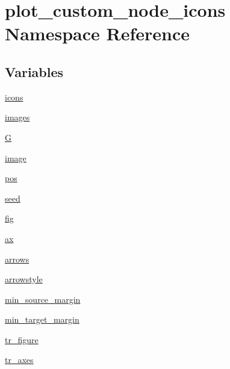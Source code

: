 \hypertarget{namespaceplot__custom__node__icons}{}\section{plot\+\_\+custom\+\_\+node\+\_\+icons Namespace Reference}
\label{namespaceplot__custom__node__icons}
\subsection*{Variables}
\begin{DoxyCompactItemize}
\item 
\hyperlink{namespaceplot__custom__node__icons_aac9e2479fe73f982e5131d12e30c472a}{icons}
\item 
\hyperlink{namespaceplot__custom__node__icons_a2dc5d47cfa47552a3cfc688160a954e0}{images}
\item 
\hyperlink{namespaceplot__custom__node__icons_ad0a8ac6ac593ba54a2e51a55e01ab8ff}{G}
\item 
\hyperlink{namespaceplot__custom__node__icons_a7757b01723f5675b0dc4c08966ae6eeb}{image}
\item 
\hyperlink{namespaceplot__custom__node__icons_a75672c8fced787072bbe8ed3eca7752d}{pos}
\item 
\hyperlink{namespaceplot__custom__node__icons_aae3e1f6f9d5d976f22908b54b8b5779d}{seed}
\item 
\hyperlink{namespaceplot__custom__node__icons_ad8137e4a72dc20d65848cf76ba421cf0}{fig}
\item 
\hyperlink{namespaceplot__custom__node__icons_aa6e807b10295ec70a54db2f32ee12298}{ax}
\item 
\hyperlink{namespaceplot__custom__node__icons_a5170af57723c73a5fa90a7a8f3e66cd7}{arrows}
\item 
\hyperlink{namespaceplot__custom__node__icons_ac7523f31b7fdc3da4f53e636aaa09e55}{arrowstyle}
\item 
\hyperlink{namespaceplot__custom__node__icons_a6f1de1e479b22541e28ef9036ddff4bb}{min\+\_\+source\+\_\+margin}
\item 
\hyperlink{namespaceplot__custom__node__icons_a550bc8f29b1bb7a3af2dbb512b5a2497}{min\+\_\+target\+\_\+margin}
\item 
\hyperlink{namespaceplot__custom__node__icons_a941a1c64a46b9ca1c8166a84c50fc2c4}{tr\+\_\+figure}
\item 
\hyperlink{namespaceplot__custom__node__icons_afc2f05dd13fe694dad1139d7af53b0d1}{tr\+\_\+axes}

\end{DoxyCompactItemize}
